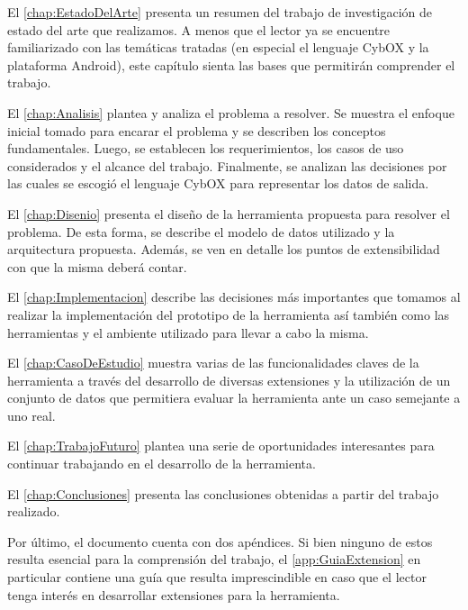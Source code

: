 El \autoref{chap:EstadoDelArte} presenta un resumen del trabajo de investigación de estado del arte que realizamos. A menos que el lector ya se encuentre familiarizado con las temáticas tratadas (en especial el lenguaje CybOX y la plataforma Android), este capítulo sienta las bases que permitirán comprender el trabajo.

El \autoref{chap:Analisis} plantea y analiza el problema a resolver. Se muestra el enfoque inicial tomado para encarar el problema y se describen los conceptos fundamentales. Luego, se establecen los requerimientos, los casos de uso considerados y el alcance del trabajo. Finalmente, se analizan las decisiones por las cuales se escogió el lenguaje CybOX para representar los datos de salida.

El \autoref{chap:Disenio} presenta el diseño de la herramienta propuesta para resolver el problema. De esta forma, se describe el modelo de datos utilizado y la arquitectura propuesta. Además, se ven en detalle los puntos de extensibilidad con que la misma deberá contar.

El \autoref{chap:Implementacion} describe las decisiones más importantes que tomamos al realizar la implementación del prototipo de la herramienta así también como las herramientas y el ambiente utilizado para llevar a cabo la misma.

El \autoref{chap:CasoDeEstudio} muestra varias de las funcionalidades claves de la herramienta a través del desarrollo de diversas extensiones y la utilización de un conjunto de datos que permitiera evaluar la herramienta ante un caso semejante a uno real.

El \autoref{chap:TrabajoFuturo} plantea una serie de oportunidades interesantes para continuar trabajando en el desarrollo de la herramienta.

El \autoref{chap:Conclusiones} presenta las conclusiones obtenidas a partir del trabajo realizado.

Por último, el documento cuenta con dos apéndices. Si bien ninguno de estos resulta esencial para la comprensión del trabajo, el \autoref{app:GuiaExtension} en particular contiene una guía que resulta imprescindible en caso que el lector tenga interés en desarrollar extensiones para la herramienta.